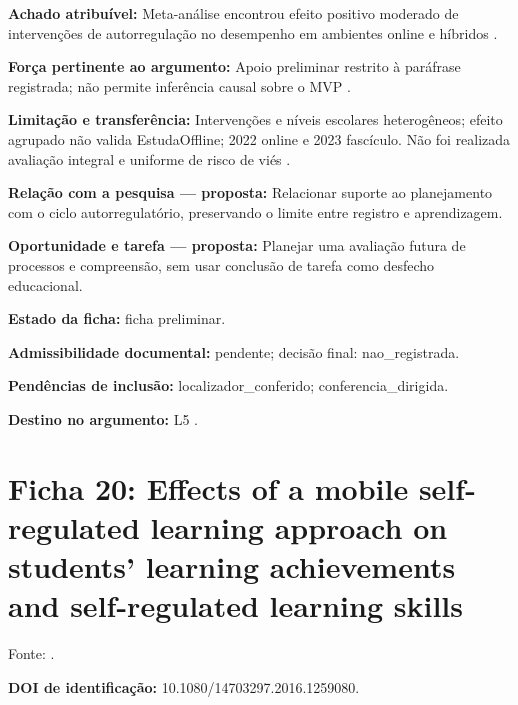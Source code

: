 \noindent\textbf{Achado atribuível:} Meta-análise encontrou efeito positivo moderado de intervenções de autorregulação no desempenho em ambientes online e híbridos \citep{education_xu2022}.\par\medskip

\noindent\textbf{Força pertinente ao argumento:} Apoio preliminar restrito à paráfrase registrada; não permite inferência causal sobre o MVP \citep{education_xu2022}.\par\medskip

\noindent\textbf{Limitação e transferência:} Intervenções e níveis escolares heterogêneos; efeito agrupado não valida EstudaOffline; 2022 online e 2023 fascículo. Não foi realizada avaliação integral e uniforme de risco de viés \citep{education_xu2022}.\par\medskip

\noindent\textbf{Relação com a pesquisa — proposta:} Relacionar suporte ao planejamento com o ciclo autorregulatório, preservando o limite entre registro e aprendizagem.\par\medskip

\noindent\textbf{Oportunidade e tarefa — proposta:} Planejar uma avaliação futura de processos e compreensão, sem usar conclusão de tarefa como desfecho educacional.\par\medskip

\noindent\textbf{Estado da ficha:} ficha preliminar.\par\medskip

\noindent\textbf{Admissibilidade documental:} pendente; decisão final: nao\_registrada.\par\medskip

\noindent\textbf{Pendências de inclusão:} localizador\_conferido; conferencia\_dirigida.\par\medskip

\noindent\textbf{Destino no argumento:} L5 .

\clearpage\section*{Ficha 20: Effects of a mobile self-regulated learning approach on students’ learning achievements and self-regulated learning skills}

Fonte: \citet{education_zheng2016}.

\noindent\textbf{DOI de identificação:} 10.1080/14703297.2016.1259080.\par\medskip

